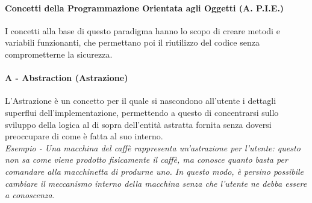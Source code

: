 \documentclass{article}
\begin{document}
            \paragraph{Concetti della Programmazione Orientata agli Oggetti (A. P.I.E.)}
            I concetti alla base di questo paradigma hanno lo scopo di creare metodi e variabili funzionanti, che permettano poi il riutilizzo del codice senza comprometterne la sicurezza.
            
            \paragraph{A - Abstraction (Astrazione)} L'Astrazione è un concetto per il quale si nascondono all'utente i dettagli superflui dell'implementazione, permettendo a questo di concentrarsi sullo sviluppo della logica al di sopra dell'entità astratta fornita senza doversi preoccupare di come è fatta al suo interno.\\
            \textit{Esempio - Una macchina del caffè rappresenta un'astrazione per l'utente: questo non sa come viene prodotto fisicamente il caffè, ma conosce quanto basta per comandare alla macchinetta di produrne uno. In questo modo, è persino possibile cambiare il meccanismo interno della macchina senza che l'utente ne debba essere a conoscenza.}
\end{document}
